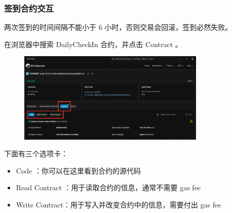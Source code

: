 \documentclass{beamer}
\begin{document}
\begin{frame}
    \frametitle{签到合约交互}

    两次签到的时间间隔不能小于 6 小时，否则交易会回滚，签到必然失败。

    在浏览器中搜索 DailyCheckIn 合约，并点击 Contract 。

    \begin{figure}
        \centering
        \includegraphics[width=0.8\textwidth]{s2.png}
    \end{figure}

    下面有三个选项卡：

    \begin{itemize}
        \item Code ：你可以在这里看到合约的源代码
        \item Read Contract ：用于读取合约的信息，通常不需要 gas fee
        \item Write Contract：用于写入并改变合约中的信息，需要付出 gas fee
    \end{itemize}

\end{frame}
\end{document}
